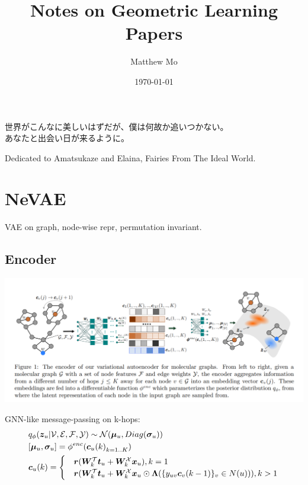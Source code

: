 \documentclass{article}
\title{\textbf{Notes on Geometric Learning Papers}}
\author{Matthew Mo}
\date{\today}
\begin{document}
\maketitle
\section*{ }
\label{contents}
\tableofcontents

\newenvironment{dedication}
    {\clearpage           %
    \thispagestyle{empty}%
    \vspace*{\stretch{1}}%
    \itshape \Large             %
    \raggedleft          %
    }
    {\par %
    \vspace{\stretch{3}} %
    \clearpage           %
    }

\begin{dedication}
    {
    \mincho
    世界がこんなに美しいはずだが、僕は何故か追いつかない。\\
    あなたと出会い日が来るように。
    }

    Dedicated to Amatsukaze and Elaina, Fairies From The Ideal World.
\end{dedication}


\section{NeVAE}
     VAE on graph, node-wise repr, permutation invariant.
    \subsection{Encoder}
    \centerline{\includegraphics[width=0.85\paperwidth]{nevae-enc.PNG}}

    GNN-like message-passing on k-hops:
    \begin{align}
        &q_\phi(\boldsymbol{z}_u|\mathcal{V,E,F,Y})\sim\mathcal{N}(\boldsymbol{\mu}_u,Diag(\boldsymbol{\sigma}_u))\\
        &[\boldsymbol{\mu}_u, \boldsymbol{\sigma}_u]=\phi^{enc}({\boldsymbol{c}_u(k)}_{k=1..K})\\
        &\boldsymbol{c}_u(k)=
        \begin{cases}
            &\boldsymbol{r}(\boldsymbol{W}_k^\mathcal{T}\boldsymbol{t}_u + \boldsymbol{W}_k^\mathcal{X}\boldsymbol{x}_u),k=1\\
            &\boldsymbol{r}(\boldsymbol{W}_k^\mathcal{T}\boldsymbol{t}_u + \boldsymbol{W}_k^\mathcal{X}\boldsymbol{x}_u\odot \boldsymbol{\Lambda}(\{y_{uv} \boldsymbol{c}_v(k-1)\}_v\in N(u))),k>1
        \end{cases}
    \end{align}
\end{document}
